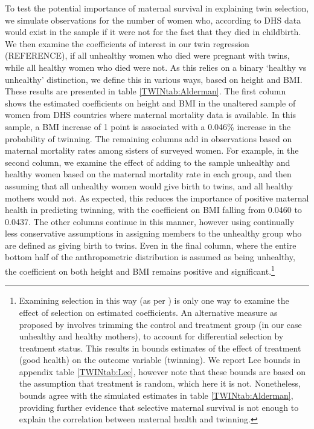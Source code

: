\documentclass[subeqn]{article}
\begin{document}
\begin{spacing}{1.4}
To test the potential importance of maternal survival in explaining twin selection, 
we simulate observations for the number of women who, according to DHS data would 
exist in the sample if it were not for the fact that they died in childbirth.  We 
then examine the coefficients of interest in our twin regression (REFERENCE), if
all unhealthy women who died were pregnant with twins, while all healthy women
who died were not.  As this relies on a binary `healthy vs unhealthy' 
distinction, we define this in various ways, based on height and BMI.  These
results are presented in table \ref{TWINtab:Alderman}.  The first column shows
the estimated coefficients on height and BMI in the unaltered sample of women
from DHS countries where maternal mortality data is available.  In this sample,
a BMI increase of 1 point is associated with a 0.046\% increase in the 
probability of twinning.  The remaining columns add in observations based on
maternal mortality rates among sisters of surveyed women.  For example, in the
second column, we examine the effect of adding to the sample unhealthy and
healthy women based on the maternal mortality rate in each group, and then
assuming that all unhealthy women would give birth to twins, and all healthy
mothers would not.  As expected, this reduces the importance of positive 
maternal health in predicting twinning, with the coefficient on BMI falling from
0.0460 to 0.0437.  The other columns continue in this manner, however using
continually less conservative assumptions in assigning members to the unhealthy 
group who are defined as giving birth to twins.  Even in the final column, where 
the entire bottom half of the anthropometric distribution is assumed as being 
unhealthy, the coefficient on both height and BMI remains positive and 
significant.\footnote{Examining selection in this way (as per 
\citet{Aldermanetal2011}) is only one way to examine the effect of selection on 
estimated coefficients.  An alternative measure as proposed by \citet{Lee2009} 
involves trimming the control and treatment group (in our case unhealthy and 
healthy mothers), to account for differential selection by treatment status.  
This results in bounds estimates of the effect of treatment (good health) on 
the outcome variable (twinning).  We report Lee bounds in appendix table 
\ref{TWINtab:Lee}, however note that these bounds are based on the assumption 
that treatment is random, which here it is not.  Nonetheless, \citet{Lee2009} 
bounds agree with the simulated estimates in table \ref{TWINtab:Alderman}, 
providing further evidence that selective maternal survival is not enough to 
explain the correlation between maternal health and twinning.}



\end{spacing}
\end{document}
